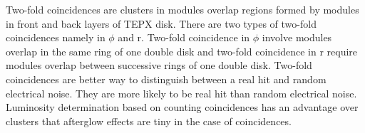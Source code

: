 Two-fold coincidences are clusters in modules overlap regions formed by modules in front and back layers of TEPX disk. There are two types of two-fold coincidences namely in $\phi$ and r. Two-fold coincidence in $\phi$ involve modules overlap in the same ring  of one double disk and two-fold coincidence in r require modules overlap between successive rings of one double disk.  Two-fold coincidences are better way to distinguish between a real hit and random electrical noise. They are more likely to be real hit than random electrical noise. Luminosity determination based on counting coincidences has an advantage over clusters that afterglow effects are tiny in the case of coincidences. 

